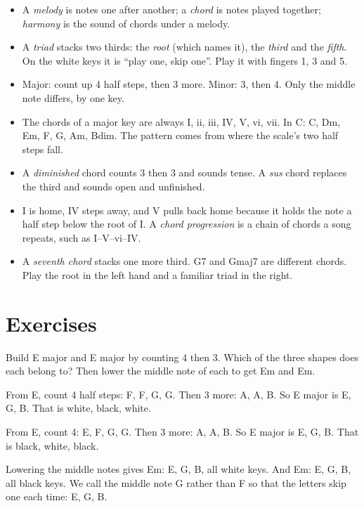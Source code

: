 \begin{summarybox}
\begin{itemize}
  \item A \emph{melody} is notes one after another; a \emph{chord} is notes played together; \emph{harmony} is the sound of chords under a melody.
  \item A \emph{triad} stacks two thirds: the \emph{root} (which names it), the \emph{third} and the \emph{fifth}. On the white keys it is ``play one, skip one''. Play it with fingers 1, 3 and 5.
  \item Major: count up 4 half steps, then 3 more. Minor: 3, then 4. Only the middle note differs, by one key.
  \item The chords of a major key are always I, ii, iii, IV, V, vi, vii\textdegree. In C: C, Dm, Em, F, G, Am, Bdim. The pattern comes from where the scale's two half steps fall.
  \item A \emph{diminished} chord counts 3 then 3 and sounds tense. A \emph{sus} chord replaces the third and sounds open and unfinished.
  \item I is home, IV steps away, and V pulls back home because it holds the note a half step below the root of I. A \emph{chord progression} is a chain of chords a song repeats, such as I--V--vi--IV.
  \item A \emph{seventh chord} stacks one more third. G7 and Gmaj7 are different chords. Play the root in the left hand and a familiar triad in the right.
\end{itemize}
\end{summarybox}

\section*{Exercises}

\begin{exercise}
Build E major and E\fl{} major by counting 4 then 3. Which of the three shapes does each belong to? Then lower the middle note of each to get Em and E\fl m.
\end{exercise}

\begin{answerbox}
From E, count 4 half steps: F, F\sh, G, G\sh. Then 3 more: A, A\sh, B. So E major is E, G\sh, B.  That is white, black, white.

From E\fl, count 4: E, F, G\fl, G. Then 3 more: A\fl, A, B\fl. So E\fl{} major is E\fl, G, B\fl{}.  That is black, white, black.

Lowering the middle notes gives Em: E, G, B,  all white keys. And E\fl m: E\fl, G\fl, B\fl{},  all black keys. We call the middle note G\fl{} rather than F\sh{} so that the letters skip one each time: E, G, B.
\end{answerbox}


